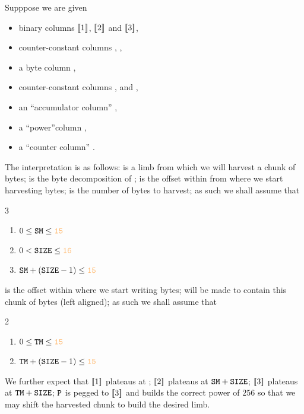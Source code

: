 Supppose we are given
\begin{itemize}
	\item binary columns $[\![1]\!]$, $[\![2]\!]$ and $[\![3]\!]$,
	\item counter-constant columns  \source{}, \target{},
	\item a byte column \source{}\byte{},
	\item counter-constant columns \source{}\mark{}, \target{}\mark{} and \size{},
	\item an ``accumulator column'' \ACC{},
	\item a ``power''column ,
	\item a ``counter column'' \ct{}.
\end{itemize}
The interpretation is as follows:
\source{} is a limb from which we will harvest a chunk of bytes;
\source{}\byte{} is the byte decomposition of \source{};
\source{}\mark{} is the offset within \source{} from where we start harvesting bytes;
\size{} is the number of bytes to harvest;
as such we shall assume that
\begin{multicols}{3}
	\begin{enumerate}
		\item $0 \leq \source\mark \leq \llargeMO$
		\item $0 < \size \leq \llarge$
		\item $\source{}\mark{} + (\size{}-1) \leq \llargeMO$
	\end{enumerate}
\end{multicols}
\noindent \target{}\mark{} is the offset within \target{} where we start writing bytes;
\target{} will be made to contain this chunk of bytes (left aligned);
as such we shall assume that
\begin{multicols}{2}
	\begin{enumerate}
		\item $0 \leq \target\mark \leq \llargeMO$
		\item $\target{}\mark{} + (\size{}-1) \leq \llargeMO$
	\end{enumerate}
\end{multicols}
\noindent We further expect that
$[\![1]\!]$ plateaus at \source{}\mark{};
$[\![2]\!]$ plateaus at $\texttt{S}{}\texttt{M}{} + \texttt{SIZE}{}$;
$[\![3]\!]$ plateaus at $\texttt{T}{}\texttt{M}{} + \texttt{SIZE}{}$;
$\texttt{P}$ is pegged to $[\![3]\!]$ and builds the correct power of $256$ so that we may shift the harvested chunk to build the desired limb.


